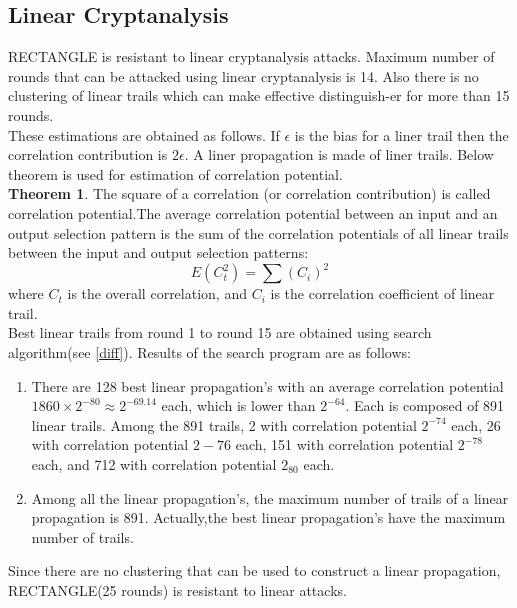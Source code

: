 \documentclass[final]{transcrypto}
\begin{document}
\subsection{Linear Cryptanalysis}
RECTANGLE is resistant to linear cryptanalysis attacks. Maximum number of rounds that can be attacked using linear cryptanalysis is 14. Also there is no clustering of linear trails which can make effective distinguish-er for more than 15 rounds.\\
These estimations are obtained as follows. If $\epsilon$ is the bias for a liner trail then the correlation contribution is $2\epsilon$. A liner propagation is made of liner trails. Below theorem is used for estimation of correlation potential.\\
\textbf{Theorem 1}. The square of a correlation (or correlation contribution) is called correlation potential.The average correlation potential between an input and an output selection pattern is the sum of the correlation potentials of all linear trails between the input and output selection patterns:
$$E(C_t^2) = \sum (C_i)^2$$ 
where $C_t$ is the overall correlation, and $C_i$ is the correlation coefficient of linear trail.\\
Best linear trails from round 1 to round 15 are obtained using search algorithm(see \ref{diff}). Results of the search program are as follows:\cite{rectangle}\cite{imprAttack}
\begin{enumerate}
    \item There are 128 best linear propagation's with an average correlation potential $1860\times 2^{-80}\approx 2^{-69.14}$ each, which is lower than $2^{-64}$. Each is composed of 891 linear trails. Among the 891 trails, 2 with correlation potential $2^{-74}$ each, 26 with correlation potential $2-{76}$ each, 151 with correlation potential $2^{-78}$ each, and 712 with correlation potential $2_80$ each.
    \item Among all the linear propagation's, the maximum number of trails of a linear propagation is 891. Actually,the best linear propagation's have the maximum number of trails.
\end{enumerate}
Since there are no clustering that can be used to construct a linear propagation, RECTANGLE(25 rounds) is resistant to linear attacks. 
\end{document}
